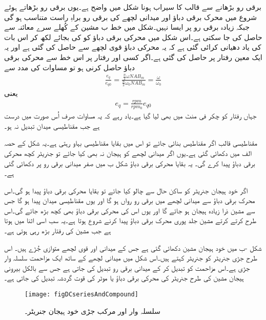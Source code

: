 برقی رو بڑھانے سے قالب کا سیراب ہونا شکل   میں واضح ہے۔یوں برقی رو بڑھاتے ہوئے شروع میں محرک برقی دباؤ اور میدانی لچھے کی برقی رو براہِ راست متناسب ہو گی جبکہ زیادہ برقی رو پر ایسا نہیں۔شکل میں خط ب مشین کے کُھلے سرے معائنہ سے حاصل کی جا سکتی ہے۔اس شکل میں محرکی برقی دباؤ کو  کی بجائے   لکھ کر اس بات کی یاد دھیانی کرائی گئی ہے کہ یہ محرکی دباؤ  قوی لچھے سے حاصل کی گئی ہے اور یہ ایک معین رفتار  پر حاصل کی گئی ہے۔اگر کسی اور رفتار  پر اس خط سے محرکی برقی دباؤ  حاصل کرنی ہو تو مساوات   کی مدد سے
\begin{align}
\frac{e_q}{e_{q0}}=\frac{\frac{n}{2} \omega N A B_m}{\frac{n}{2} \omega_0 N A B_m}=\frac{\omega}{\omega_0}
\end{align}
یعنی
\begin{align}\label{مساوات_یکسمتی_چکر_بالمقابل_رفتار}
e_q=\frac{rpm}{rpm_0} e_{q0}
\end{align}
جہاں رفتار کو چکر فی منٹ میں بھی لیا گیا ہے۔یاد رہے کہ یہ مساوات صرف اُس صورت میں درست ہے جب مقناطیسی میدان تبدیل نہ ہو۔

مقناطیسی قالب اگر مقناطیس بنائی جائے تو اس میں بقایا مقناطیسی بہاو رہتی ہے۔یہ شکل کے حصہ الف میں دکھائی گئی ہے۔یوں اگر میدانی لچھے کو ہیجان نہ بھی کیا جائے تو جنریٹر کچھ محرکی برقی دباؤ پیدا کرے گی۔ یہ بقایا  محرکی برقی دباؤ شکل ب میں صفر میدانی برقی رو پر دکھائی گئی ہے۔

 اگر خود ہیجان جنریٹر کو ساکن حال سے چالو کیا جائے تو بقایا محرکی برقی دباؤ پیدا ہو گی۔اس محرک برقی دباؤ سے میدانی لچھے میں برقی رو رواں ہو گا اور یوں مقناطیسی میدان پیدا ہو گا جس سے مشین ذرا زیادہ ہیجان ہو جائے گا اور یوں اس کی محرکی برقی دباؤ بھی کچھ بڑھ جائے گی۔اس طرح کرتے کرتے مشین جلد پوری محرک برقی دباؤ پیدا کرنے شروع ہوتا ہے۔یہ سب اسی اثنا میں ہوتا ہے جب مشین کی رفتار بڑھ رہی ہوتی ہے۔

شکل -ب میں خود ہیجان مشین دکھائی گئی ہے جس کے میدانی اور قوی لچھے متوازی جُڑے ہیں۔ اس طرح جڑی جنریٹر کو  جنریٹر کہتے ہیں۔اس شکل میں میدانی لچھے کے ساتھ ایک مزاحمت سلسلہ وار جڑی ہے۔اس مزاحمت کو تبدیل کر کے میدانی برقی رو تبدیل کی جاتی ہے جس سے بالکل بیرونی ہیجان مشین کی طرح جنریٹر کی محرکی برقی دباؤ یا موٹر کی قوت گردشہ تبدیل کی جاتی ہے۔
\begin{figure}
\centering
\texttt{[image: figDCseriesAndCompound]}
\caption{سلسلہ وار اور مرکب جڑی خود ہیجان جنریٹر۔}
\label{شکل_یکسمتی_سلسلہ_وار_اور_مرکب}
\end{figure}

